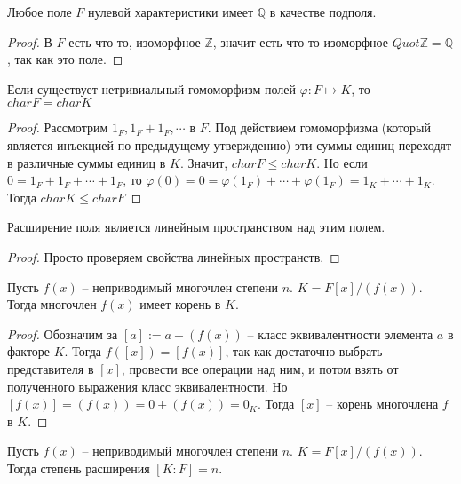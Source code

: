 \documentclass{article}
\begin{document}
\begin{statement}
    Любое поле $F$ нулевой характеристики имеет $\mathbb{Q}$ в качестве подполя.
\end{statement}

\begin{proof}
    В $F$ есть что-то, изоморфное $\mathbb{Z}$, значит есть что-то изоморфное $Quot \mathbb{Z} = \mathbb{Q}$, так как
    это поле.
\end{proof}

\begin{statement}
    Если существует нетривиальный гомоморфизм полей $\varphi: F \mapsto K$, то $char F = char K$
\end{statement}

\begin{proof}
    Рассмотрим $1_F, 1_F + 1_F, \cdots$ в $F$. Под действием гомоморфизма (который является инъекцией по предыдущему
    утверждению) эти суммы единиц переходят в различные суммы единиц в $K$. Значит, $char F \leq char K$. Но если $0 =
    1_F
    + 1_F + \cdots + 1_F$, то $\varphi(0) = 0 = \varphi(1_F) + \cdots + \varphi(1_F) = 1_K + \cdots + 1_K$. Тогда $char
    K \leq char F$
\end{proof}

\begin{statement}
    Расширение поля является линейным пространством над этим полем.
\end{statement}

\begin{proof}
    Просто проверяем свойства линейных пространств.
\end{proof}

\begin{statement}
    Пусть $f(x)$ -- неприводимый многочлен степени $n$. $K = F[x] / (f(x))$. Тогда многочлен $f(x)$ имеет корень в $K$.
\end{statement}

\begin{proof}
    Обозначим за $[a] := a + (f(x))$ -- класс эквивалентности элемента $a$ в факторе $K$.
    Тогда $f([x]) = [f(x)]$, так как достаточно выбрать
    представителя в $[x]$, провести все операции над ним, и потом взять от полученного выражения класс эквивалентности.
    Но $[f(x)] = (f(x)) = 0 + (f(x)) = 0_K$. Тогда $[x]$ -- корень многочлена $f$ в $K$.
\end{proof}

\begin{statement}
    Пусть $f(x)$ -- неприводимый многочлен степени $n$. $K = F[x] / (f(x))$. Тогда степень расширения $[K : F] = n$.
\end{statement}
\end{document}
